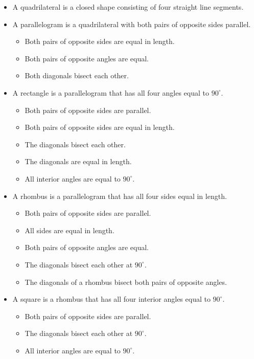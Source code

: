 \begin{itemize}
\item A quadrilateral is a closed shape consisting of four straight line segments.
\item A parallelogram is a quadrilateral with both pairs of opposite sides parallel.
  \begin{itemize}
  \item Both pairs of opposite sides are equal in length.
  \item Both pairs of opposite angles are equal.
  \item Both diagonals bisect each other.
  \end{itemize}
\item A rectangle is a parallelogram that has all four angles equal to $90^\circ$.
  \begin{itemize}
  \item Both pairs of opposite sides are parallel.
  \item Both pairs of opposite sides are equal in length.
  \item The diagonals bisect each other.
  \item The diagonals are equal in length.
  \item All interior angles are equal to $90^{\circ}$.
  \end{itemize}
\item A rhombus is a parallelogram that has all four sides equal in length.
  \begin{itemize}
  \item Both pairs of opposite sides are parallel.
  \item All sides are equal in length.
  \item Both pairs of opposite angles are equal.
  \item The diagonals bisect each other at $90^\circ$.
  \item The diagonals of a rhombus bisect both pairs of opposite angles.
  \end{itemize}
\item A square is a rhombus that has all four interior angles equal to $90^\circ$.
  \begin{itemize}
\item Both pairs of opposite sides are parallel.
  \item The diagonals bisect each other at $90^\circ$.
  \item All interior angles are equal to $90^\circ$.


\end{itemize}
\end{itemize}
